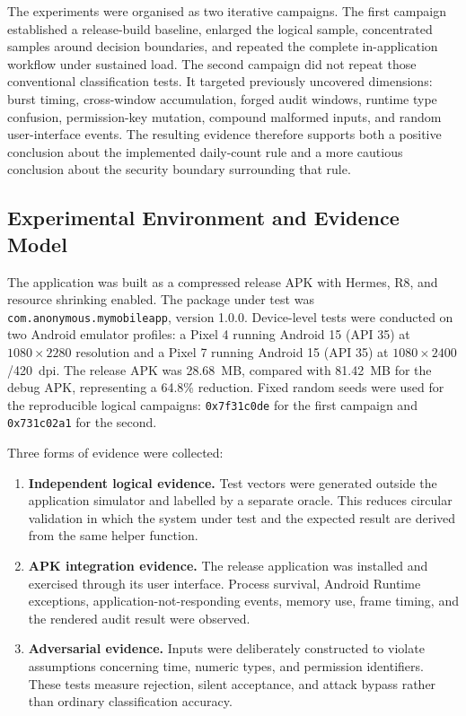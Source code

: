 The experiments were organised as two iterative campaigns. The first campaign established a release-build baseline, enlarged the logical sample, concentrated samples around decision boundaries, and repeated the complete in-application workflow under sustained load. The second campaign did not repeat those conventional classification tests. It targeted previously uncovered dimensions: burst timing, cross-window accumulation, forged audit windows, runtime type confusion, permission-key mutation, compound malformed inputs, and random user-interface events. The resulting evidence therefore supports both a positive conclusion about the implemented daily-count rule and a more cautious conclusion about the security boundary surrounding that rule.

\subsection{Experimental Environment and Evidence Model}

The application was built as a compressed release APK with Hermes, R8, and resource shrinking enabled. The package under test was \texttt{com.anonymous.mymobileapp}, version 1.0.0. Device-level tests were conducted on two Android emulator profiles: a Pixel 4 running Android 15 (API 35) at $1080 \times 2280$ resolution and a Pixel 7 running Android 15 (API 35) at $1080 \times 2400$/420~dpi. The release APK was 28.68~MB, compared with 81.42~MB for the debug APK, representing a 64.8\% reduction. Fixed random seeds were used for the reproducible logical campaigns: \texttt{0x7f31c0de} for the first campaign and \texttt{0x731c02a1} for the second.

Three forms of evidence were collected:

\begin{enumerate}
    \item \textbf{Independent logical evidence.} Test vectors were generated outside the application simulator and labelled by a separate oracle. This reduces circular validation in which the system under test and the expected result are derived from the same helper function.
    \item \textbf{APK integration evidence.} The release application was installed and exercised through its user interface. Process survival, Android Runtime exceptions, application-not-responding events, memory use, frame timing, and the rendered audit result were observed.
    \item \textbf{Adversarial evidence.} Inputs were deliberately constructed to violate assumptions concerning time, numeric types, and permission identifiers. These tests measure rejection, silent acceptance, and attack bypass rather than ordinary classification accuracy.
\end{enumerate}


